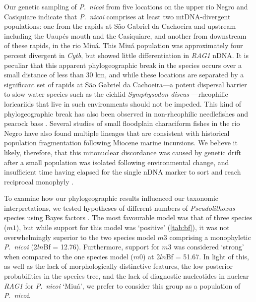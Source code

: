 \documentclass[12pt]{article}
\begin{document}
Our genetic sampling of \emph{P}.\ \emph{nicoi} from five locations on the upper rio Negro and Casiquiare indicate that \emph{P}.\ \emph{nicoi} comprises at least two mtDNA-divergent populations: one from the rapids at São Gabriel da Cachoeira and upstream including the Uaupés mouth and the Casiquiare, and another from downstream of these rapids, in the rio Miuá. %
This Miuá population was approximately four percent divergent in \emph{Cytb}, but showed little differentiation in \emph{RAG1} nDNA. %
It is peculiar that this apparent phylogeographic break in the species occurs over a small distance of less than 30 km, and while these locations are separated by a significant set of rapids at São Gabriel da Cachoeira---a potent dispersal barrier to slow water species such as the cichlid \emph{Symphysodon discus} \citep{Farias2008}---rheophilic loricariids that live in such environments should not be impeded. %
This kind of phylogeographic break has also been observed in non-rheophilic needlefishes \citep[\emph{Potamorrhaphis};][]{Lovejoy2000} and peacock bass \citep[\emph{Cichla};][]{Willis2007}. %
Several studies of small floodplain characiform fishes in the rio Negro \citep[e.g.][]{Cooke2009,Piggott2011,Schneider2012,Sistrom2009,Terencio2012} have also found multiple lineages that are consistent with historical population fragmentation following Miocene marine incursions. %
We believe it likely, therefore, that this mitonuclear discordance was caused by genetic drift after a small population was isolated following environmental change, and insufficient time having elapsed for the single nDNA marker to sort and reach reciprocal monophyly \citep{Edwards2009,Zink2008}.%

To examine how our phylogeographic results influenced our taxonomic interpretations, we tested hypotheses of different numbers of \emph{Pseudolithoxus} species using Bayes factors \citep[see][for interpretation of Bayes factors]{Kass1995}. %
The most favourable model was that of three species ($m1$), but while support for this model was `positive' (\autoref{tab:bf}), it was not overwhelmingly superior to the two species model $m3$ comprising a monophyletic \emph{P}.\ \emph{nicoi} (2$ln$Bf = 12.76). %
Furthermore, support for $m3$ was considered `strong' when compared to the one species model ($m0$) at 2$ln$Bf = 51.67. %
In light of this, as well as the lack of morphologically distinctive features, the low posterior probabilities in the species tree, and the lack of diagnostic nucleotides in nuclear \emph{RAG1} for \emph{P}.\ \emph{nicoi} `Miuá', we prefer to consider this group as a population of \emph{P}.\ \emph{nicoi}.%
\end{document}
